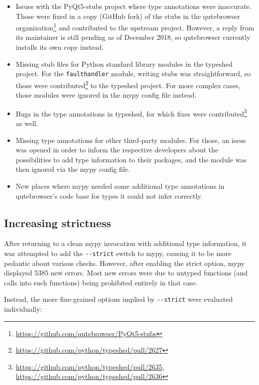 \documentclass[a4paper,parskip=full]{scrreprt}
\begin{document}
\begin{itemize}
  \item Issues with the PyQt5-stubs project where type annotations were
    inaccurate. Those were fixed in a copy (GitHub fork) of the stubs in the
    qutebrowser
    organization\footnote{\url{https://github.com/qutebrowser/PyQt5-stubs}} and
    contributed to the upstream project. However, a reply from its maintainer is
    still pending as of December 2018, so qutebrowser currently installs its own
    copy instead.
  \item Missing stub files for Python standard library modules in the typeshed
    project. For the \verb|faulthandler| module, writing stubs was
    straightforward, so those were
    contributed\footnote{\url{https://github.com/python/typeshed/pull/2627}} to
    the typeshed project. For more complex cases, those modules were ignored in
    the mypy config file instead.
  \item Bugs in the type annotations in typeshed, for which fixes were
    contributed\footnote{\url{https://github.com/python/typeshed/pull/2635}, \\
      \url{https://github.com/python/typeshed/pull/2636}} as well.
  \item Missing type annotations for other third-party modules. For those, an
    issue was opened in order to inform the respective developers about the
    possibilities to add type information to their packages, and the module was
    then ignored via the mypy config file.
  \item New places where mypy needed some additional type annotations in
    qutebrowser's code base for types it could not infer correctly.
\end{itemize}

\subsection{Increasing strictness}

After returning to a clean mypy invocation with additional type information, it
was attempted to add the \verb|--strict| switch to mypy, causing it to be more
pedantic about various checks. However, after enabling the strict option, mypy
displayed 5385 new errors. Most new errors were due to untyped functions (and
calls into such functions) being prohibited entirely in that case.

Instead, the more fine-grained options implied by \verb|--strict| were evaluated
individually:
\end{document}
